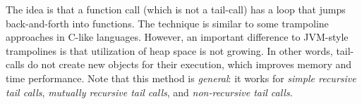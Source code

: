 \noindent The idea is that a function call (which is not a tail-call)
has a loop that jumps back-and-forth into functions. The technique
is similar to some trampoline approaches in C-like languages. However,
an important difference to JVM-style trampolines is that utilization of heap space is not growing.
In other words, tail-calls do not create new objects for their execution, which
improves memory and time performance.
Note that this method is \emph{general}: it works for \emph{simple recursive
tail calls}, \emph{mutually recursive tail calls}, and \emph{non-recursive tail calls}.
